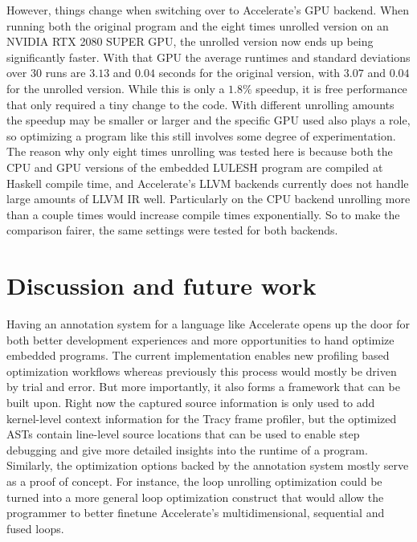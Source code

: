\documentclass[fontsize=11pt,a4paper,parskip=half,numbers=noenddot]{scrartcl}
\begin{document}
However, things change when switching over to Accelerate's GPU backend. When
running both the original program and the eight times unrolled version on an
NVIDIA RTX 2080 SUPER GPU, the unrolled version now ends up being significantly
faster. With that GPU the average runtimes and standard deviations over 30 runs
are $3.13$ and $0.04$ seconds for the original version, with $3.07$ and $0.04$
for the unrolled version. While this is only a $1.8\%$ speedup, it is free
performance that only required a tiny change to the code. With different
unrolling amounts the speedup may be smaller or larger and the specific GPU used
also plays a role, so optimizing a program like this still involves some degree
of experimentation. The reason why only eight times unrolling was tested here is
because both the CPU and GPU versions of the embedded LULESH program are
compiled at Haskell compile time, and Accelerate's LLVM backends currently does
not handle large amounts of LLVM IR well. Particularly on the CPU backend
unrolling more than a couple times would increase compile times exponentially.
So to make the comparison fairer, the same settings were tested for both
backends.

\section{Discussion and future work}

Having an annotation system for a language like Accelerate opens up the door for
both better development experiences and more opportunities to hand optimize
embedded programs. The current implementation enables new profiling based
optimization workflows whereas previously this process would mostly be driven by
trial and error. But more importantly, it also forms a framework that can be
built upon. Right now the captured source information is only used to add
kernel-level context information for the Tracy frame profiler, but the optimized
ASTs contain line-level source locations that can be used to enable step
debugging and give more detailed insights into the runtime of a program.
Similarly, the optimization options backed by the annotation system mostly serve
as a proof of concept. For instance, the loop unrolling optimization could be
turned into a more general loop optimization construct that would allow the
programmer to better finetune Accelerate's multidimensional, sequential and
fused loops.
\end{document}
